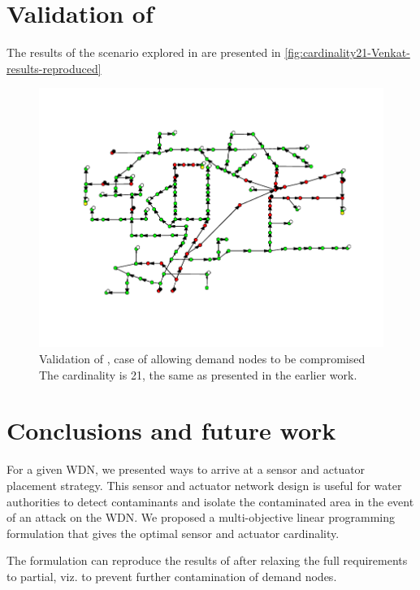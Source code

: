\documentclass[authoryear,preprint,review,12pt]{elsarticle}
\begin{document}
\section{Validation of \cite{palleti_actuator_2018}}
The results of the scenario explored in \cite{palleti_actuator_2018} are presented in \autoref{fig:cardinality21-Venkat-results-reproduced}
\begin{figure}[!hptb]
\protect\includegraphics[width=\linewidth]{images/cardinality21_Venkat_results_reproduced}\protect\caption{Validation of \cite{palleti_actuator_2018}, case of allowing demand nodes to be compromised
\protect \\
The cardinality is 21, the same as presented in the earlier work.}

    \label{fig:cardinality21-Venkat-results-reproduced}
\end{figure}



\section{Conclusions and future work}

For a given WDN, we presented ways to arrive at a sensor and actuator
placement strategy. This sensor and actuator network design is useful
for water authorities to detect contaminants and isolate the contaminated
area in the event of an attack on the WDN. We proposed a multi-objective
linear programming formulation that gives the optimal sensor and actuator
cardinality.

The formulation can reproduce the results of \cite{palleti_actuator_2018} after relaxing
the full requirements to partial, viz. to prevent further contamination
of demand nodes.
\end{document}
